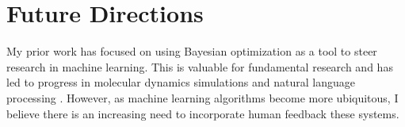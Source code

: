\section*{Future Directions}
My prior work has focused on using Bayesian optimization as a tool to steer research in machine learning. This is valuable for fundamental research and has led to progress in molecular dynamics simulations \cite{Bhomik2018Clustering} and natural language processing \cite{Gao2017HAN}. However, as machine learning algorithms become more ubiquitous, I believe there is an increasing need to incorporate human feedback these systems. 